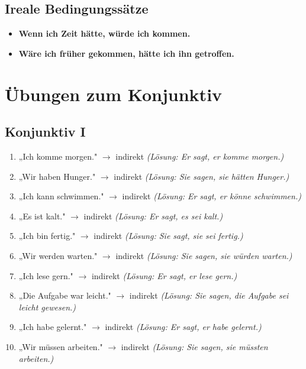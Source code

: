 \subsection{Ireale Bedingungssätze}
\begin{itemize}
    \item \textbf{Wenn ich Zeit hätte, würde ich kommen.}
    \item \textbf{Wäre ich früher gekommen, hätte ich ihn getroffen.}
\end{itemize}

\section{Übungen zum Konjunktiv}
\label{sec:KonjunktivUebungen}

\subsection{Konjunktiv I}
\begin{enumerate}
    \item „Ich komme morgen." $\rightarrow$ indirekt \quad \textit{(Lösung: Er sagt, er komme morgen.)}
    \item „Wir haben Hunger." $\rightarrow$ indirekt \quad \textit{(Lösung: Sie sagen, sie hätten Hunger.)}
    \item „Ich kann schwimmen." $\rightarrow$ indirekt \quad \textit{(Lösung: Er sagt, er könne schwimmen.)}
    \item „Es ist kalt." $\rightarrow$ indirekt \quad \textit{(Lösung: Er sagt, es sei kalt.)}
    \item „Ich bin fertig." $\rightarrow$ indirekt \quad \textit{(Lösung: Sie sagt, sie sei fertig.)}
    \item „Wir werden warten." $\rightarrow$ indirekt \quad \textit{(Lösung: Sie sagen, sie würden warten.)}
    \item „Ich lese gern." $\rightarrow$ indirekt \quad \textit{(Lösung: Er sagt, er lese gern.)}
    \item „Die Aufgabe war leicht." $\rightarrow$ indirekt \quad \textit{(Lösung: Sie sagen, die Aufgabe sei leicht gewesen.)}
    \item „Ich habe gelernt." $\rightarrow$ indirekt \quad \textit{(Lösung: Er sagt, er habe gelernt.)}
    \item „Wir müssen arbeiten." $\rightarrow$ indirekt \quad \textit{(Lösung: Sie sagen, sie müssten arbeiten.)}
\end{enumerate}

